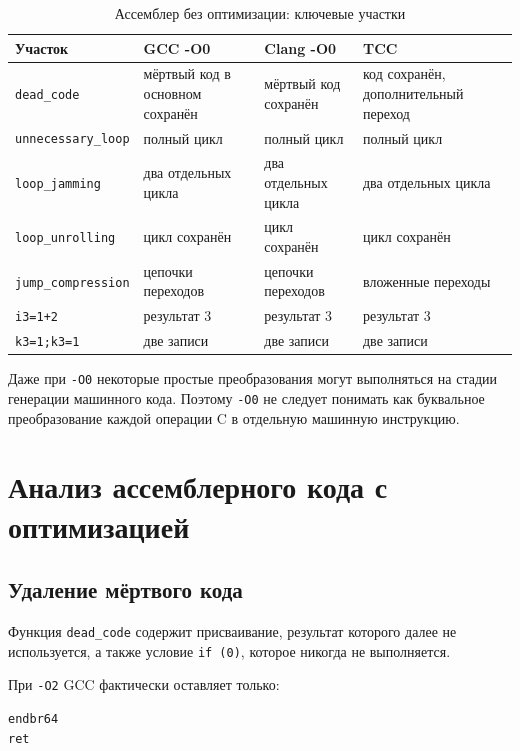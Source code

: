 \documentclass[12pt,a4paper]{article}
\begin{document}
\begin{table}[H]
\centering
\caption{Ассемблер без оптимизации: ключевые участки}
\small
\begin{tabular}{p{3cm}p{3.5cm}p{3.5cm}p{3.5cm}}
\toprule
Участок & GCC -O0 & Clang -O0 & TCC \\
\midrule
\texttt{dead\_code} & мёртвый код в основном сохранён &
мёртвый код сохранён & код сохранён, дополнительный переход \\
\texttt{unnecessary\_loop} & полный цикл &
полный цикл & полный цикл \\
\texttt{loop\_jamming} & два отдельных цикла &
два отдельных цикла & два отдельных цикла \\
\texttt{loop\_unrolling} & цикл сохранён &
цикл сохранён & цикл сохранён \\
\texttt{jump\_compression} & цепочки переходов &
цепочки переходов & вложенные переходы \\
\texttt{i3=1+2} & результат 3 & результат 3 & результат 3 \\
\texttt{k3=1;k3=1} & две записи &
две записи & две записи \\
\bottomrule
\end{tabular}
\end{table}

Даже при \texttt{-O0} некоторые простые преобразования могут выполняться на стадии генерации машинного кода. Поэтому \texttt{-O0} не следует понимать как буквальное преобразование каждой операции C в отдельную машинную инструкцию.

\section{Анализ ассемблерного кода с оптимизацией}

\subsection{Удаление мёртвого кода}

Функция \texttt{dead\_code} содержит присваивание, результат которого далее не используется, а также условие \texttt{if (0)}, которое никогда не выполняется.

При \texttt{-O2} GCC фактически оставляет только:

\begin{lstlisting}
endbr64
ret
\end{lstlisting}
\end{document}

